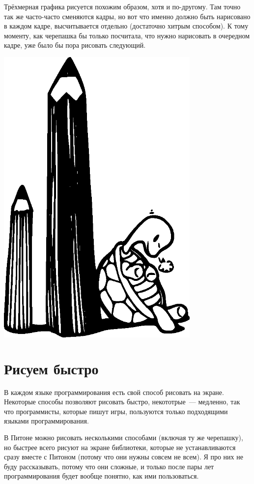 Трёхмерная графика рисуется похожим образом, хотя и по-другому. Там точно так же часто-часто сменяются кадры, но вот что именно должно быть нарисовано в каждом кадре, высчитывается отдельно (достаточно хитрым способом). К тому моменту, как черепашка бы только посчитала, что нужно нарисовать в очередном кадре, уже было бы пора рисовать следующий.

\begin{center}
\includegraphics*[width=100mm]{../en/turtle1.eps}
\end{center}

\section{Рисуем быстро}

В каждом языке программирования есть свой способ рисовать на экране. Некоторые способы позволяют рисовать быстро, некототрые — медленно, так что программисты, которые пишут игры, пользуются только подходящими языками программирования.

В Питоне можно рисовать несколькими способами (включая ту же черепашку), но быстрее всего рисуют на экране библиотеки, которые не устанавливаются сразу вместе с Питоном (потому что они нужны совсем не всем). Я про них не буду рассказывать, потому что они сложные, и только после пары лет программирования будет вообще понятно, как ими пользоваться.

